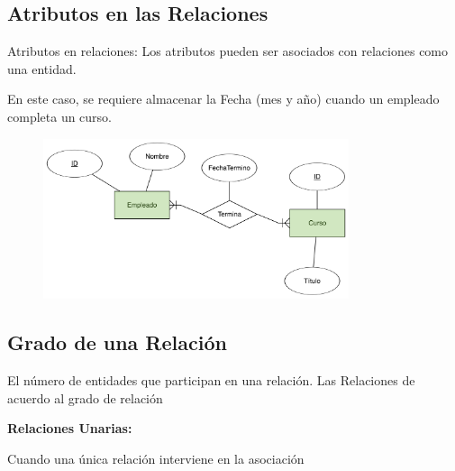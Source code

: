 \documentclass[12pt, fleqn]{report}                             %
\theoremstyle{break}                                            %
\begin{document}
        \clearpage
        \subsection{Atributos en las Relaciones}

            Atributos en relaciones: Los atributos pueden ser asociados con relaciones
            como una entidad.

            En este caso, se requiere almacenar la Fecha (mes y año) cuando un empleado
            completa un curso.


            \begin{figure}[h]
                \centering
                \includegraphics[width=0.80\textwidth]{RelacionConAtributos}
            \end{figure}

        \subsection{Grado de una Relación}

            El número de entidades que participan en una relación.
            Las Relaciones de acuerdo al grado de relación

            \textbf{Relaciones Unarias: }

                Cuando una única relación interviene en la asociación
\end{document}
